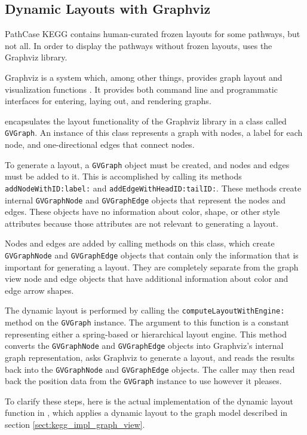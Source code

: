 \subsection{Dynamic Layouts with Graphviz}
\label{sect:kegg_impl_graphviz}

PathCase KEGG contains human-curated frozen layouts for some pathways, but not
all. In order to display the pathways without frozen layouts, \keggapp
uses the Graphviz library.

Graphviz is a system which, among other things, provides graph layout and
visualization functions \cite{graphviz}. It provides both command line and
programmatic interfaces for entering, laying out, and rendering graphs.

\keggapp encapsulates the layout functionality of the Graphviz library in a
class called \texttt{GVGraph}. An instance of this class represents a graph with
nodes, a label for each node, and one-directional edges that connect nodes.

To generate a layout, a \texttt{GVGraph} object must be created, and nodes and
edges must be added to it. This is accomplished by calling its methods
\texttt{addNodeWithID:label:} and \texttt{addEdgeWithHeadID:tailID:}. These
methods create internal \texttt{GVGraphNode} and \texttt{GVGraphEdge} objects
that represent the nodes and edges. These objects have no information about
color, shape, or other style attributes because those attributes are not
relevant to generating a layout.

Nodes and edges are added by calling methods on this class, which create
\texttt{GVGraphNode} and \texttt{GVGraphEdge} objects that contain only the
information that is important for generating a layout. They are completely
separate from the graph view node and edge objects that have additional
information about color and edge arrow shapes.

The dynamic layout is performed by calling the \texttt{computeLayoutWithEngine:}
method on the \texttt{GVGraph} instance. The argument to this function is a
constant representing either a spring-based or hierarchical layout engine. This
method converts the \texttt{GVGraphNode} and \texttt{GVGraphEdge} objects into
Graphviz's internal graph representation, asks Graphviz to generate a layout,
and reads the results back into the \texttt{GVGraphNode} and
\texttt{GVGraphEdge} objects. The caller may then read back the position data
from the \texttt{GVGraph} instance to use however it pleases.

To clarify these steps, here is the actual implementation of the dynamic layout
function in \keggapp, which applies a dynamic layout to the graph model
described in section \ref{sect:kegg_impl_graph_view}.

